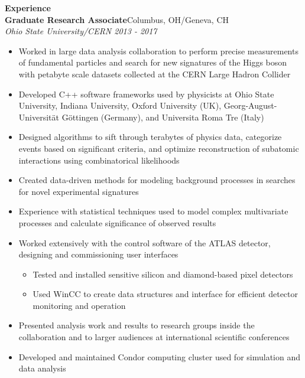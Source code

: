 \documentclass[line]{letter}
\begin{document}
{\vspace{5pt} \Large \bf Experience \vspace{7pt}\\}
{\large {\bf Graduate Research Associate}\hfill Columbus, OH/Geneva, CH\vspace{1mm}}\\
{\large \it Ohio State University/CERN \hfill  2013 - 2017} \\
\vspace{-5mm}
\begin{itemize}
\item Worked in large data analysis collaboration to perform precise measurements of fundamental particles and search for new signatures of the Higgs boson with petabyte scale datasets collected at the CERN Large Hadron Collider
\item Developed C++ software frameworks used by physicists at Ohio State University, Indiana University, Oxford University (UK), Georg-August-Universit{\"a}t G{\"o}ttingen (Germany), and Universita Roma Tre (Italy)
\item Designed algorithms to sift through terabytes of physics data, categorize events based on significant criteria, and optimize reconstruction of subatomic interactions using combinatorical likelihoods 
\item Created data-driven methods for modeling background processes in searches for novel experimental signatures 
\item Experience with statistical techniques used to model complex multivariate processes and calculate significance of observed results
\item Worked extensively with the control software of the ATLAS detector, designing and commissioning user interfaces
\begin{itemize}
\item Tested and installed sensitive silicon and diamond-based pixel detectors
\item Used WinCC to create data structures and interface for efficient detector monitoring and operation
\end{itemize}\vspace{2mm}
\item Presented analysis work and results to research groups inside the collaboration and to larger audiences at international scientific conferences\vspace{2mm}
\item Developed and maintained Condor computing cluster used for simulation and data analysis
\end{itemize}
\vspace{2mm}
\end{document}
